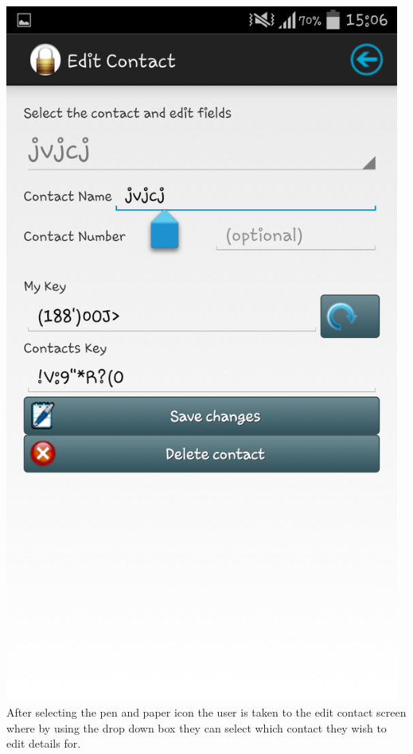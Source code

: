 \begin{center}
 \includegraphics[width=13cm]{screenshots/normal/4_EditContact.png}
\textbf{\\}
 After selecting the pen and paper icon the user is taken to the edit contact screen where by using the drop down box they can select which contact they wish to edit details for.
\end{center}
